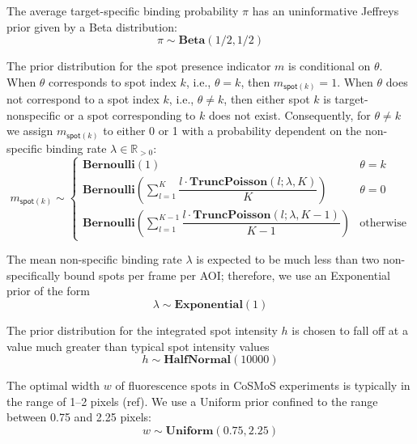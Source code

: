 The average target-specific binding probability $\pi$ has an uninformative Jeffreys prior given by a Beta distribution:
%
\begin{equation}
    \pi \sim \mathbf{Beta}(1/2, 1/2)
\end{equation}

The prior distribution for the spot presence indicator $m$ is conditional on $\theta$. When $\theta$ corresponds to spot index $k$, i.e., $\theta = k$, then $m_{\mathsf{spot}(k)} = 1$. When $\theta$ does not correspond to a spot index $k$, i.e., $\theta \neq k$, then either spot $k$ is target-nonspecific or a spot corresponding to $k$ does not exist. Consequently, for $\theta \neq k$ we assign $m_{\mathsf{spot}(k)}$ to either 0 or 1 with a probability dependent on the non-specific binding rate $\lambda \in \mathbb{R}_{>0}$:
%
\begin{equation}
    m_{\mathsf{spot}(k)} \sim
    \begin{cases}
        \mathbf{Bernoulli}(1) & \text{$\theta = k$} \\
        \mathbf{Bernoulli} \left( \sum_{l=1}^K \dfrac{l \cdot \mathbf{TruncPoisson}(l; \lambda, K)}{K} \right) & \text{$\theta = 0$} \\
        \mathbf{Bernoulli} \left( \sum_{l=1}^{K-1} \dfrac{l \cdot \mathbf{TruncPoisson}(l; \lambda, K-1)}{K-1} \right) & \text{otherwise}
    \end{cases}
\end{equation}

The mean non-specific binding rate $\lambda$ is expected to be much less than two non-specifically bound spots per frame per AOI; therefore, we use an Exponential prior of the form
%
\begin{equation}
    \lambda \sim \mathbf{Exponential}(1)
\end{equation}

The prior distribution for the integrated spot intensity $h$ is chosen to fall off at a value much greater than typical spot intensity values 
%
\begin{equation}
    h \sim \mathbf{HalfNormal}(10000)
\end{equation}

The optimal width $w$ of fluorescence spots in CoSMoS experiments is typically in the range of 1--2 pixels (ref). We use a Uniform prior confined to the range between 0.75 and 2.25 pixels:
%
\begin{equation}
    w \sim \mathbf{Uniform}(0.75, 2.25)
\end{equation}

